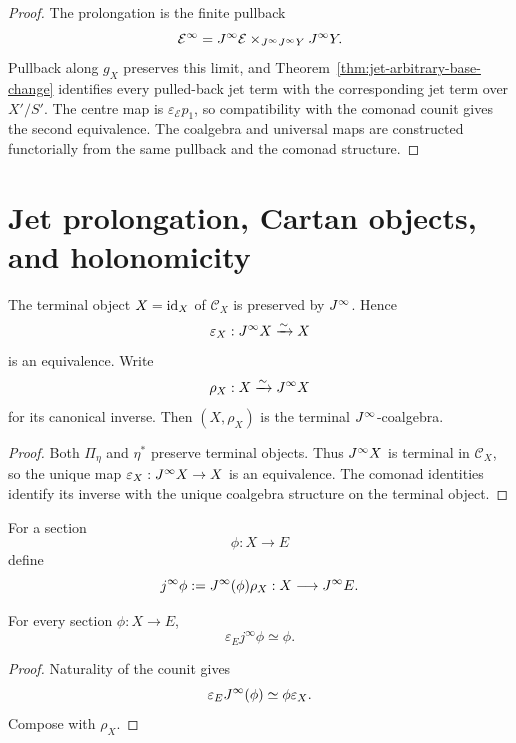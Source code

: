 \begin{proof}
The prolongation is the finite pullback
\[
    \mathcal E^\infty
    =
    J^{\infty}\mathcal E\times_{J^{\infty}J^{\infty} Y}J^{\infty} Y.
\]
Pullback along $g_X$ preserves this limit, and Theorem~\ref{thm:jet-arbitrary-base-change} identifies every pulled-back jet term with the corresponding jet term over $X'/S'$.  The centre map is $\varepsilon_{\mathcal E}p_1$, so compatibility with the comonad counit gives the second equivalence.  The coalgebra and universal maps are constructed functorially from the same pullback and the comonad structure.
\end{proof}

\section{Jet prolongation, Cartan objects, and holonomicity}
\label{sec:holonomic-sections}
\label{sec:cartan-structure}

\begin{proposition}
\label{prop:jet-terminal}
The terminal object $X=\operatorname{id}_X$ of $\mathcal C_X$ is preserved by $J^{\infty}$.  Hence
\[
    \varepsilon_X:J^{\infty} X\xrightarrow{\sim}X
\]
is an equivalence.  Write
\[
    \rho_X:X\xrightarrow{\sim}J^{\infty} X
\]
for its canonical inverse.  Then $(X,\rho_X)$ is the terminal $J^{\infty}$-coalgebra.
\end{proposition}

\begin{proof}
Both $\Pi_\eta$ and $\eta^*$ preserve terminal objects.  Thus $J^{\infty} X$ is terminal in $\mathcal C_X$, so the unique map $\varepsilon_X:J^{\infty} X\to X$ is an equivalence.  The comonad identities identify its inverse with the unique coalgebra structure on the terminal object.
\end{proof}

\begin{definition}
\label{def:section-jet-prolongation}
For a section
\[
    \phi:X\longrightarrow E
\]
define
\[
    j^\infty\phi
    :=
    J^{\infty}(\phi)\rho_X:
    X\longrightarrow J^{\infty} E.
\]
\end{definition}

\begin{proposition}
\label{prop:jet-evaluation-section}
For every section $\phi:X\to E$,
\[
    \varepsilon_Ej^\infty\phi\simeq\phi.
\]
\end{proposition}

\begin{proof}
Naturality of the counit gives
\[
    \varepsilon_EJ^{\infty}(\phi)
    \simeq
    \phi\varepsilon_X.
\]
Compose with $\rho_X$.
\end{proof}

